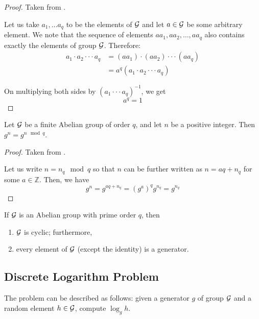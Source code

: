 \begin{proof}

Taken from \cite{koocmsc}.

Let us take $ a_1, \ldots a_q $ to be the elements of $\mathcal{G}$ and let $ a \in \mathcal{G} $ be some arbitrary element. We note that the sequence of elements $ aa_1, aa_2, \ldots , aa_q $ also contains exactly the elements of group $ \mathcal{G} $. Therefore:
\begin{equation*}
\begin{split}
a_1 \cdot a_2 \cdot \cdot \cdot a_q
&= (aa_1) \cdot (aa_2) \cdot \cdot \cdot (aa_q)\\
&= a^q (a_1 \cdot a_2 \cdot \cdot \cdot a_q)
\end{split}
\end{equation*}

On multiplying both sides by $ (a_1 \cdot \cdot \cdot a_q)^{-1} $, we get 
\begin{equation*}
a^q = 1
\end{equation*}
\end{proof}

\begin{corollary}
Let $ \mathcal{G} $ be a finite Abelian group of order $ q $, and let $ n $ be a positive integer.
Then $ g^n = g^{n \mod q} $.
\end{corollary}

\begin{proof}

Taken from \cite{koocmsc}.

Let us write $ n = n_q \mod q $ so that $ n $ can be further written as $ n = aq + n_q $ for some $ a \in \mathbb{Z} $. Then, we have
\begin{equation*}
g^n = g^{aq+n_q} = (g^a)^q g^{n_q} = g^{n_q}
\end{equation*}
\end{proof}

\begin{lemma}
If $ \mathcal{G} $ is an Abelian group with prime order $ q $, then 
\begin{enumerate}
    \item $ \mathcal{G} $ is cyclic; furthermore,
    \item every element of $ \mathcal{G} $ (except the identity) is a generator.
\end{enumerate}
\end{lemma}

\subsection{Discrete Logarithm Problem}
The problem can be described as follows: given a generator $ g $ of group $ \mathcal{G} $ and a random element $ h \in \mathcal{G} $, compute $ \log_g h $.

